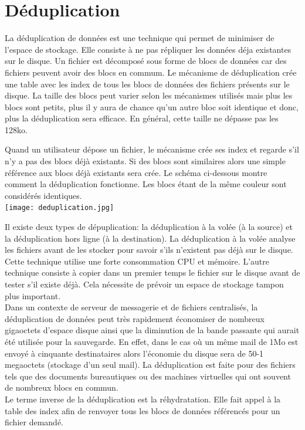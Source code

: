 \documentclass[a4paper]{report}
\begin{document}
	\chapter{Déduplication}
	La déduplication de données est une technique qui permet de minimiser de l'espace de stockage. Elle consiste à ne pas répliquer les données déja existantes sur le disque. Un fichier est décomposé sous forme de blocs de données car des fichiers peuvent avoir des blocs en commum. Le mécanisme de déduplication crée une table avec les index de tous les blocs de données des fichiers présents sur le disque. La taille des blocs peut varier selon les mécanismes utilisés mais plus les blocs sont petits, plus il y aura de chance qu'un autre bloc soit identique et donc, plus la déduplication sera efficace. En général, cette taille ne dépasse pas les 128ko.
 
 Quand un utilisateur dépose un fichier, le mécanisme crée ses index et regarde s'il n'y a pas des blocs déjà existants. Si des blocs sont similaires alors une simple référence aux blocs déjà existants sera crée. Le schéma ci-dessous montre comment la déduplication fonctionne. Les blocs étant de la même couleur sont considérés identiques.\\
\texttt{[image: deduplication.jpg]}

Il existe deux types de dépuplication: la déduplication à la volée (à la source) et la déduplication hors ligne (à la destination). La déduplication à la volée analyse les fichiers avant de les stocker pour savoir s'ils n'existent pas déjà sur le disque. Cette technique utilise une forte consommation CPU et mémoire. L'autre technique consiste à copier dans un premier temps le fichier sur le disque avant de tester s'il existe déjà. Cela nécessite de prévoir un espace de stockage tampon plus important. \\

Dans un contexte de serveur de messagerie et de fichiers centralisés, la déduplication de données peut très rapidement économiser de nombreux gigaoctets d'espace disque ainsi que la diminution de la bande passante qui aurait été utilisée pour la sauvegarde. En effet, dans le cas où un même mail de 1Mo est envoyé à cinquante destinataires alors l'économie du disque sera de 50-1 megaoctets (stockage d'un seul mail). La déduplication est faite pour des fichiers tels que des documents bureautiques ou des machines virtuelles qui ont souvent de nombreux blocs en commun.\\
Le terme inverse de la déduplication est la réhydratation. Elle fait appel à la table des index afin de renvoyer tous les blocs de données référencés pour un fichier demandé.\\
\end{document}
